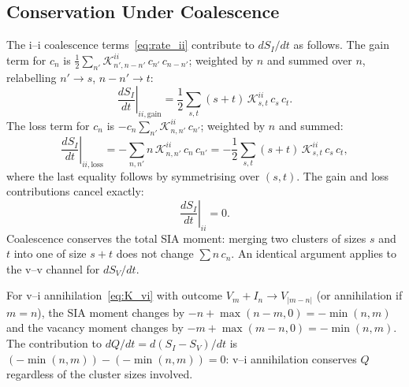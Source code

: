 \subsection{Conservation Under Coalescence}
\label{app:coal}

The i--i coalescence terms~\eqref{eq:rate_ii} contribute to $dS_I/dt$ as
follows. The gain term for $c_n$ is
$\tfrac{1}{2}\sum_{n'}\mathcal{K}_{n',n-n'}^{ii}\,c_{n'}\,c_{n-n'}$;
weighted by $n$ and summed over $n$, relabelling $n' \to s$, $n-n' \to t$:
\begin{equation}
    \left.\frac{dS_I}{dt}\right|_{ii,\mathrm{gain}}
    = \frac{1}{2}\sum_{s,t}(s+t)\,\mathcal{K}_{s,t}^{ii}\,c_s\,c_t.
\end{equation}
The loss term for $c_n$ is $-c_n\sum_{n'}\mathcal{K}_{n,n'}^{ii}\,c_{n'}$;
weighted by $n$ and summed:
\begin{equation}
    \left.\frac{dS_I}{dt}\right|_{ii,\mathrm{loss}}
    = -\sum_{n,n'} n\,\mathcal{K}_{n,n'}^{ii}\,c_n\,c_{n'}
    = -\frac{1}{2}\sum_{s,t}(s+t)\,\mathcal{K}_{s,t}^{ii}\,c_s\,c_t,
\end{equation}
where the last equality follows by symmetrising over $(s,t)$. The gain and
loss contributions cancel exactly:
\begin{equation}
    \left.\frac{dS_I}{dt}\right|_{ii} = 0.
\end{equation}
Coalescence conserves the total SIA moment: merging two clusters of sizes
$s$ and $t$ into one of size $s+t$ does not change $\sum n\,c_n$. An
identical argument applies to the v--v channel for $dS_V/dt$.

For v--i annihilation~\eqref{eq:K_vi} with outcome $V_m + I_n \to
V_{|m-n|}$ (or annihilation if $m=n$), the SIA moment changes by
$-n + \max(n-m,0) = -\min(n,m)$ and the vacancy moment changes by
$-m + \max(m-n,0) = -\min(n,m)$. The contribution to $dQ/dt =
d(S_I-S_V)/dt$ is $(-\min(n,m)) - (-\min(n,m)) = 0$: v--i annihilation
conserves $Q$ regardless of the cluster sizes involved. \checkmark

